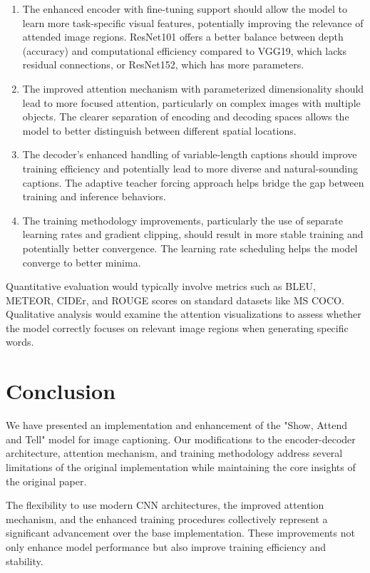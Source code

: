 \documentclass{article}
\theoremstyle{plain}
\theoremstyle{definition}
\theoremstyle{remark}
\begin{document}
\begin{enumerate}
    \item The enhanced encoder with fine-tuning support should allow the model to learn more task-specific visual features, potentially improving the relevance of attended image regions. ResNet101 offers a better balance between depth (accuracy) and computational efficiency compared to VGG19, which lacks residual connections, or ResNet152, which has more parameters.
    
    \item The improved attention mechanism with parameterized dimensionality should lead to more focused attention, particularly on complex images with multiple objects. The clearer separation of encoding and decoding spaces allows the model to better distinguish between different spatial locations.
    
    \item The decoder's enhanced handling of variable-length captions should improve training efficiency and potentially lead to more diverse and natural-sounding captions. The adaptive teacher forcing approach helps bridge the gap between training and inference behaviors.
    
    \item The training methodology improvements, particularly the use of separate learning rates and gradient clipping, should result in more stable training and potentially better convergence. The learning rate scheduling helps the model converge to better minima.
\end{enumerate}

Quantitative evaluation would typically involve metrics such as BLEU, METEOR, CIDEr, and ROUGE scores on standard datasets like MS COCO. Qualitative analysis would examine the attention visualizations to assess whether the model correctly focuses on relevant image regions when generating specific words.

\section{Conclusion}

We have presented an implementation and enhancement of the "Show, Attend and Tell" model for image captioning. Our modifications to the encoder-decoder architecture, attention mechanism, and training methodology address several limitations of the original implementation while maintaining the core insights of the original paper.

The flexibility to use modern CNN architectures, the improved attention mechanism, and the enhanced training procedures collectively represent a significant advancement over the base implementation. These improvements not only enhance model performance but also improve training efficiency and stability.
\end{document}
